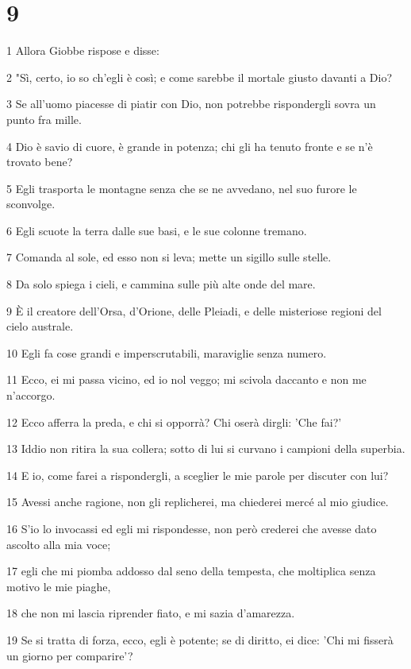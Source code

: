 \chapter{9}

\par 1 Allora Giobbe rispose e disse:
\par 2 "Sì, certo, io so ch'egli è così; e come sarebbe il mortale giusto davanti a Dio?
\par 3 Se all'uomo piacesse di piatir con Dio, non potrebbe rispondergli sovra un punto fra mille.
\par 4 Dio è savio di cuore, è grande in potenza; chi gli ha tenuto fronte e se n'è trovato bene?
\par 5 Egli trasporta le montagne senza che se ne avvedano, nel suo furore le sconvolge.
\par 6 Egli scuote la terra dalle sue basi, e le sue colonne tremano.
\par 7 Comanda al sole, ed esso non si leva; mette un sigillo sulle stelle.
\par 8 Da solo spiega i cieli, e cammina sulle più alte onde del mare.
\par 9 È il creatore dell'Orsa, d'Orione, delle Pleiadi, e delle misteriose regioni del cielo australe.
\par 10 Egli fa cose grandi e imperscrutabili, maraviglie senza numero.
\par 11 Ecco, ei mi passa vicino, ed io nol veggo; mi scivola daccanto e non me n'accorgo.
\par 12 Ecco afferra la preda, e chi si opporrà? Chi oserà dirgli: 'Che fai?'
\par 13 Iddio non ritira la sua collera; sotto di lui si curvano i campioni della superbia.
\par 14 E io, come farei a rispondergli, a sceglier le mie parole per discuter con lui?
\par 15 Avessi anche ragione, non gli replicherei, ma chiederei mercé al mio giudice.
\par 16 S'io lo invocassi ed egli mi rispondesse, non però crederei che avesse dato ascolto alla mia voce;
\par 17 egli che mi piomba addosso dal seno della tempesta, che moltiplica senza motivo le mie piaghe,
\par 18 che non mi lascia riprender fiato, e mi sazia d'amarezza.
\par 19 Se si tratta di forza, ecco, egli è potente; se di diritto, ei dice: 'Chi mi fisserà un giorno per comparire'?
